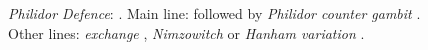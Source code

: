 \begin{figure}[H]
\begin{minipage}[b]{.246\linewidth}
\begin{framed}
\raggedright
\newgame
\emph{Philidor Defence}: .
Main line:  followed by \emph{Philidor counter gambit} .
Other lines: \emph{exchange} , \emph{Nimzowitch}  or \emph{Hanham variation} .\begin{center}
\scalebox{0.7}{\showboard}
\end{center}
\end{framed}
\end{minipage}
\end{figure}

